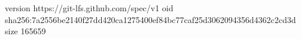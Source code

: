 version https://git-lfs.github.com/spec/v1
oid sha256:7a2556be2140f27dd420ca1275400ef84bc77caf25d3062094356d4362c2cd3d
size 165659
